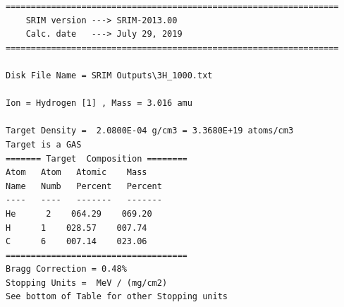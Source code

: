 \documentclass [11pt,a4paper,dvipdfmx] {jarticle}
\begin{document}
\begin{lstlisting}[caption={SRIMの出力ファイルの例。},basicstyle=\fontsize{6}{6}\ttfamily,identifierstyle=\fontsize{6}{6},numberstyle={\tiny},columns=fixed]
    ==================================================================
    SRIM version ---> SRIM-2013.00
    Calc. date   ---> July 29, 2019 
==================================================================

Disk File Name = SRIM Outputs\3H_1000.txt

Ion = Hydrogen [1] , Mass = 3.016 amu

Target Density =  2.0800E-04 g/cm3 = 3.3680E+19 atoms/cm3
Target is a GAS 
======= Target  Composition ========
Atom   Atom   Atomic    Mass     
Name   Numb   Percent   Percent  
----   ----   -------   -------  
He      2    064.29    069.20   
H      1    028.57    007.74   
C      6    007.14    023.06   
====================================
Bragg Correction = 0.48%
Stopping Units =  MeV / (mg/cm2) 
See bottom of Table for other Stopping units 


\end{lstlisting}
\end{document}
